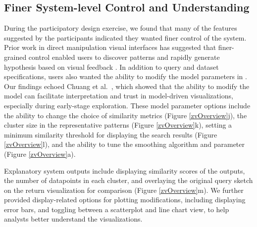 \subsection{Finer System-level Control and  Understanding}
\par During the participatory design exercise, we found that many of the features suggested by the participants indicated they wanted finer control of the system. Prior work in direct manipulation visual interfaces has suggested that finer-grained control enabled users to discover patterns and rapidly generate hypothesis based on visual feedback \cite{Shneiderman1994,Shneiderman2007a}. 
In addition to query and dataset specifications, users also wanted the ability to modify the model parameters in \zv. Our findings echoed Chuang et al.~\cite{Chuang2012}, which showed that the ability to modify the model can facilitate interpretation and trust in model-driven visualizations, especially during early-stage exploration. These model parameter options include the ability to change the choice of similarity metrics (Figure \ref{zvOverview}j), the cluster size in the representative patterns (Figure \ref{zvOverview}k), setting a minimum similarity threshold for displaying the search results (Figure \ref{zvOverview}l), and the ability to tune the smoothing algorithm and parameter (Figure \ref{zvOverview}a).

Explanatory system outputs include displaying similarity scores of the outputs, the number of datapoints in each cluster, and overlaying the original query sketch on the return visualization for comparison (Figure \ref{zvOverview}m). We further provided display-related options for plotting modifications, including displaying error bars, and toggling between a scatterplot and line chart view, to help analysts better understand the visualizations.